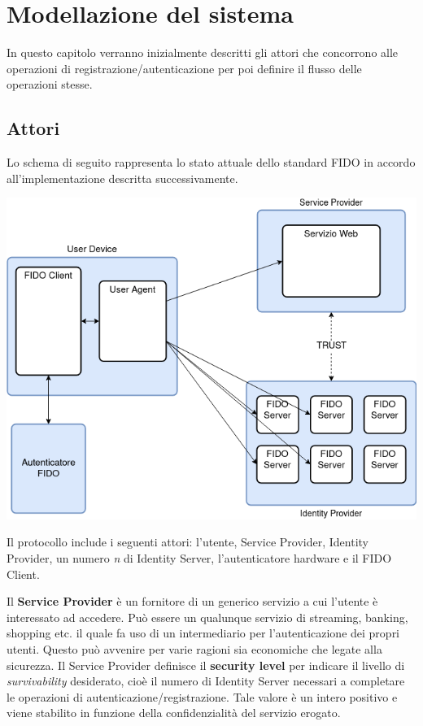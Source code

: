 \chapter{Modellazione del sistema}
\label{modellazione}

In questo capitolo verranno inizialmente descritti gli attori che concorrono alle operazioni di registrazione/autenticazione per poi definire il flusso delle operazioni stesse.

\section{Attori}
\label{attori}

Lo schema di seguito rappresenta lo stato attuale dello standard FIDO in accordo all'implementazione descritta successivamente.
\begin{center}
	\includegraphics[width=.8\columnwidth]{figures/attori.png}
	\label{fig:attori}
\end{center}


Il protocollo include i seguenti attori: l'utente, Service Provider, Identity Provider, un numero \emph{n} di Identity Server, l'autenticatore hardware e il FIDO Client. 

Il \textbf{Service Provider} è un fornitore di un generico servizio a cui l'utente è interessato ad accedere. Può essere un qualunque servizio di streaming, banking, shopping etc. il quale fa uso di un intermediario per l'autenticazione dei propri utenti. Questo può avvenire per varie ragioni sia economiche che legate alla sicurezza. 
Il Service Provider definisce il \textbf{security level} per indicare il livello di \emph{survivability} desiderato, cioè il numero di Identity Server necessari a completare le operazioni di autenticazione/registrazione. Tale valore è un intero positivo e viene stabilito in funzione della confidenzialità del servizio erogato.

